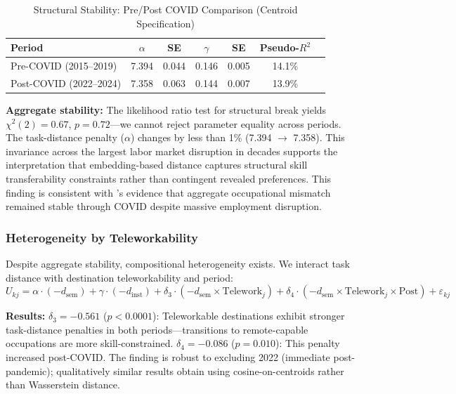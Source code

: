 \documentclass[12pt]{article}
\begin{document}
\begin{table}[h!]
\centering
\caption{Structural Stability: Pre/Post COVID Comparison (Centroid Specification)}
\label{tab:covid-stability}
\begin{tabular}{lcccccc}
\toprule
\textbf{Period} & $\alpha$ & \textbf{SE} & $\gamma$ & \textbf{SE} & \textbf{Pseudo-$R^2$} \\
\midrule
Pre-COVID (2015--2019) & 7.394 & 0.044 & 0.146 & 0.005 & 14.1\% \\
Post-COVID (2022--2024) & 7.358 & 0.063 & 0.144 & 0.007 & 13.9\% \\
\bottomrule
\end{tabular}
\end{table}


\textbf{Aggregate stability:} The likelihood ratio test for structural break yields $\chi^2(2) = 0.67$, $p = 0.72$---we cannot reject parameter equality across periods. The task-distance penalty ($\alpha$) changes by less than 1\% (7.394 $\to$ 7.358). This invariance across the largest labor market disruption in decades supports the interpretation that embedding-based distance captures structural skill transferability constraints rather than contingent revealed preferences. This finding is consistent with \citet{PizzinelliShibata2023}'s evidence that aggregate occupational mismatch remained stable through COVID despite massive employment disruption.


\subsubsection{Heterogeneity by Teleworkability}


Despite aggregate stability, compositional heterogeneity exists. We interact task distance with destination teleworkability \citep{DingelNeiman2020} and period:
\[
U_{kj} = \alpha \cdot (-d_{\mathrm{sem}}) + \gamma \cdot (-d_{\mathrm{inst}}) + \delta_3 \cdot (-d_{\mathrm{sem}} \times \mathrm{Telework}_j) + \delta_4 \cdot (-d_{\mathrm{sem}} \times \mathrm{Telework}_j \times \mathrm{Post}) + \varepsilon_{kj}
\]

\textbf{Results:} $\delta_3 = -0.561$ ($p < 0.0001$): Teleworkable destinations exhibit stronger task-distance penalties in both periods---transitions to remote-capable occupations are more skill-constrained. $\delta_4 = -0.086$ ($p = 0.010$): This penalty increased post-COVID. The finding is robust to excluding 2022 (immediate post-pandemic); qualitatively similar results obtain using cosine-on-centroids rather than Wasserstein distance.
\end{document}
